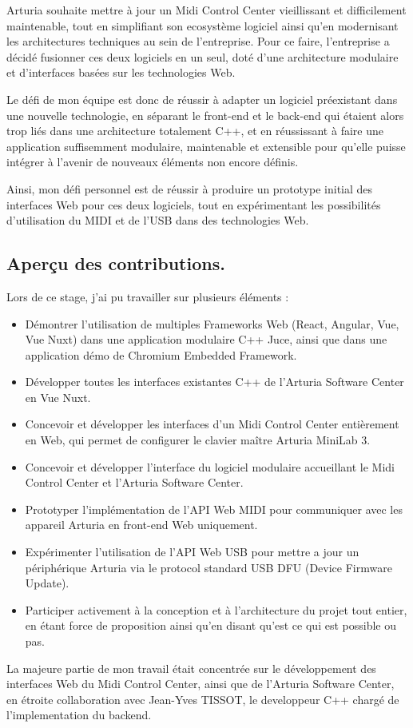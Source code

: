 \documentclass[francais]{rapportPFE}  %
\begin{document}
Arturia souhaite mettre à jour un Midi Control Center vieillissant et difficilement maintenable, tout en simplifiant son ecosystème logiciel ainsi qu'en modernisant les architectures techniques au sein de l'entreprise. Pour ce faire, l'entreprise a décidé fusionner ces deux logiciels en un seul, doté d'une architecture modulaire et d'interfaces basées sur les technologies Web. 

Le défi de mon équipe est donc de réussir à adapter un logiciel préexistant dans une nouvelle technologie, en séparant le front-end et le back-end qui étaient alors trop liés dans une architecture totalement C++, et en réussissant à faire une application suffisemment modulaire, maintenable et extensible pour qu'elle puisse intégrer à l'avenir de nouveaux éléments non encore définis.

Ainsi, mon défi personnel est de réussir à produire un prototype initial des interfaces Web pour ces deux logiciels, tout en expérimentant les possibilités d'utilisation du MIDI et de l'USB dans des technologies Web.



\subsection{Aperçu des contributions.}
Lors de ce stage, j'ai pu travailler sur plusieurs éléments : 
\begin{itemize}
    \setlength\itemsep{0em}
    \item Démontrer l'utilisation de multiples Frameworks Web (React, Angular, Vue, Vue Nuxt) dans une application modulaire C++ Juce, ainsi que dans une application démo de Chromium Embedded Framework.
    \item Développer toutes les interfaces existantes C++ de l'Arturia Software Center en Vue Nuxt.
    \item Concevoir et développer les interfaces d'un Midi Control Center entièrement en Web, qui permet de configurer le clavier maître Arturia MiniLab 3.
    \item Concevoir et développer l'interface du logiciel modulaire accueillant le Midi Control Center et l'Arturia Software Center.
    \item Prototyper l'implémentation de l'API Web MIDI pour communiquer avec les appareil Arturia en front-end Web uniquement.
    \item Expérimenter l'utilisation de l'API Web USB pour mettre a jour un périphérique Arturia via le protocol standard USB DFU (Device Firmware Update).
    \item Participer activement à la conception et à l'architecture du projet tout entier, en étant force de proposition ainsi qu'en {{disant qu'est ce qui est possible ou pas}}.
\end{itemize}
La majeure partie de mon travail était concentrée sur le développement des interfaces Web du Midi Control Center, ainsi que de l'Arturia Software Center, en étroite collaboration avec Jean-Yves TISSOT, le developpeur C++ chargé de l'implementation du backend. 
\end{document}
